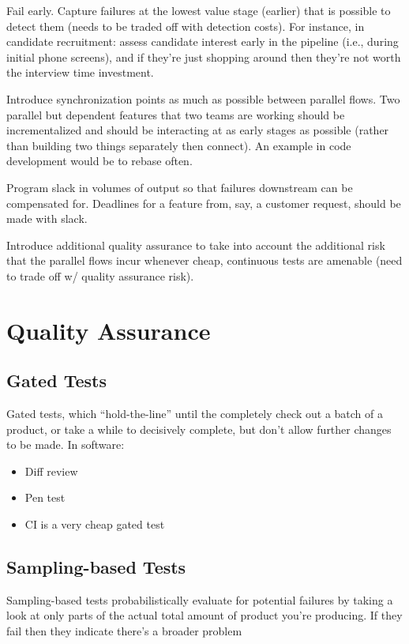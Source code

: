 \documentclass{article}
\begin{document}
Fail early. Capture failures at the lowest value stage (earlier) that is possible to detect them (needs to be traded off with detection costs). For instance, in candidate recruitment: assess candidate interest early in the pipeline (i.e., during initial phone screens), and if they’re just shopping around then they’re not worth the interview time investment.

Introduce synchronization points as much as possible between parallel flows. Two parallel but dependent features that two teams are working should be incrementalized and should be interacting at as early stages as possible (rather than building two things separately then connect). An example in code development would be to rebase often.

Program slack in volumes of output so that failures downstream can be compensated for. Deadlines for a feature from, say, a customer request, should be made with slack.

Introduce additional quality assurance to take into account the additional risk that the parallel flows incur whenever cheap, continuous tests are amenable (need to trade off w/ quality assurance risk).

\section{Quality Assurance}

\subsection{Gated Tests}

Gated tests, which “hold-the-line” until the completely check out a batch of a product, or take a while to decisively complete, but don’t allow further changes to be made. In software:

\begin{itemize}
\item Diff review
\item Pen test
\item CI is a very cheap gated test
\end{itemize}

\subsection{Sampling-based Tests}

Sampling-based tests probabilistically evaluate for potential failures by taking a look at only parts of the actual total amount of product you’re producing. If they fail then they indicate there’s a broader problem
\end{document}
